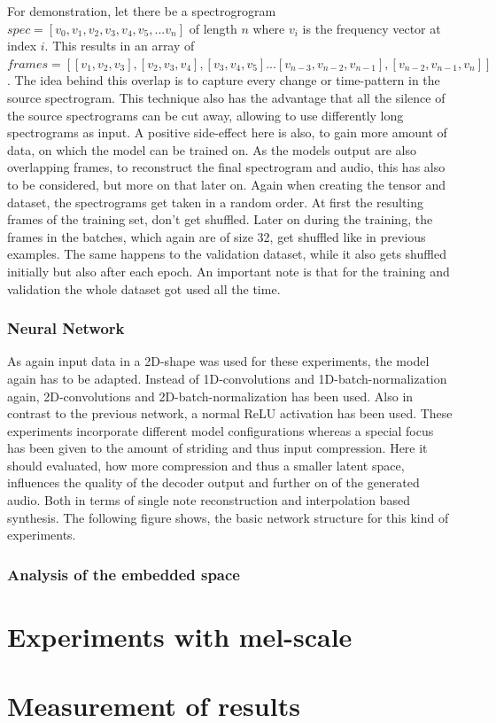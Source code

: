 For demonstration, let there be a spectrogrogram $spec=[v_0, v_1, v_2, v_3, v_4, v_5, ... v_n]$ of length $n$ where $v_i$ is the frequency vector at index $i$. This results in an array of $frames=[[v_1, v_2, v_3], [v_2, v_3, v_4], [v_3, v_4, v_5] ... [v_{n-3}, v_{n-2}, v_{n-1}], [v_{n-2}, v_{n-1}, v_n]]$. The idea behind this overlap is to capture every change or time-pattern in the source spectrogram. This technique also has the advantage that all the silence of the source spectrograms can be cut away, allowing to use differently long spectrograms as input. A positive side-effect here is also, to gain more amount of data, on which the model can be trained on. As the models output are also overlapping frames, to reconstruct the final spectrogram and audio, this has also to be considered, but more on that later on. Again when creating the tensor and dataset, the spectrograms get taken in a random order. At first the resulting frames of the training set, don't get shuffled. Later on during the training, the frames in the batches, which again are of size 32, get shuffled like in previous examples. The same happens to the validation dataset, while it also gets shuffled initially but also after each epoch. An important note is that for the training and validation the whole dataset got used all the time. 

\subsubsection{Neural Network}
As again input data in a 2D-shape was used for these experiments, the model again has to be adapted. Instead of 1D-convolutions and 1D-batch-normalization again, 2D-convolutions and 2D-batch-normalization has been used. Also in contrast to the previous network, a normal ReLU activation has been used. These experiments incorporate different model configurations whereas a special focus has been given to the amount of striding and thus input compression. Here it should evaluated, how more compression and thus a smaller latent space, influences the quality of the decoder output and further on of the generated audio. Both in terms of single note reconstruction and interpolation based synthesis. The following figure shows, the basic network structure for this kind of experiments.



\subsubsection{Analysis of the embedded space}


\section{Experiments with mel-scale}


\section{Measurement of results}